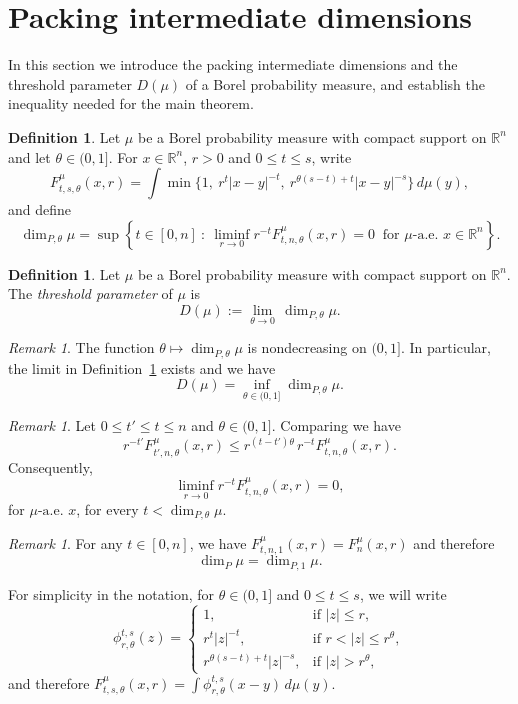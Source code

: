 \documentclass[12pt]{amsart}
\theoremstyle{definition}
\newtheorem{definition}[theorem]{Definition}
\theoremstyle{remark}
\newtheorem{remark}[theorem]{Remark}
\numberwithin{equation}{section}
\begin{document}
\section{Packing intermediate dimensions}

In this section we introduce the packing intermediate dimensions and the
threshold parameter $D(\mu)$ of a Borel probability measure, and
establish the inequality needed for the main theorem.

\begin{definition}\label{def:intermediate_profile}
Let $\mu$ be a Borel probability measure with compact support on
$\mathbb{R}^n$ and let $\theta\in(0,1]$. For $x\in\mathbb{R}^n$,
$r>0$ and $0\leq t \leq s$, write
$$F_{t,s,\theta}^{\mu}(x,r)=\int\min\{1,\ r^t|x-y|^{-t},\
r^{\theta(s-t)+t}|x-y|^{-s}\}\,d\mu(y),$$
and define
$$\dim_{P,\theta}\mu = \sup\left\{t\in[0,n]\ :\ \liminf_{r\to 0}
r^{-t}F_{t,n,\theta}^{\mu}(x,r)=0\ \text{ for } \mu\text{-a.e.\ }
x\in\mathbb{R}^{n}\right\}.$$
\end{definition}

\begin{definition}\label{maindefinition}
Let $\mu$ be a Borel probability measure with compact support on
$\mathbb{R}^n$. The \textit{threshold parameter} of $\mu$ is
$$D(\mu) := \lim_{\theta \to 0}\, \dim_{P,\theta}\mu.$$
\end{definition}


\begin{remark}\label{rem:monotone_theta}
The function $\theta\mapsto\dim_{P,\theta}\mu$ is
nondecreasing on $(0,1]$. In particular, the limit in
Definition~\ref{maindefinition} exists and we have 
$$D(\mu)=\inf_{\theta\in(0,1]}\dim_{P,\theta}\mu.$$
\end{remark}
\begin{remark}\label{rem:downward}
Let $0\leq t'\leq t\leq n$ and $\theta\in(0,1]$. Comparing we have 
$$r^{-t'}F_{t',n,\theta}^{\mu}(x,r)\leq r^{(t-t')\theta}\,
r^{-t}F_{t,n,\theta}^{\mu}(x,r).$$ Consequently, 
$$\liminf_{r\to0}r^{-t}F_{t,n,\theta}^{\mu}(x,r)=0,$$
for $\mu\text{-a.e. }x$, for every
$t<\dim_{P,\theta}\mu.$
\end{remark}
\begin{remark}\label{rem:theta_one}
For any $t\in [0,n]$, we have
$F_{t,n,1}^{\mu}(x,r)=F_n^\mu(x,r)$ and therefore
$$\dim_P \mu = \dim_{P,1} \mu.$$
\end{remark}


For simplicity in the notation, for $\theta\in(0,1]$ and $0\leq t\leq s$, we will write
$$\phi_{r,\theta}^{t,s}(z)=
\begin{cases}
1, & \text{if } |z|\leq r, \\[1mm]
r^{t}|z|^{-t}, & \text{if } r< |z| \leq r^{\theta}, \\[1mm]
r^{\theta(s-t)+t}|z|^{-s}, & \text{if } |z| > r^{\theta},
\end{cases}$$
and therefore $F_{t,s,\theta}^{\mu}(x,r)=\int \phi_{r,\theta}^{t,s}(x-y)\,d\mu(y)$.
\end{document}
